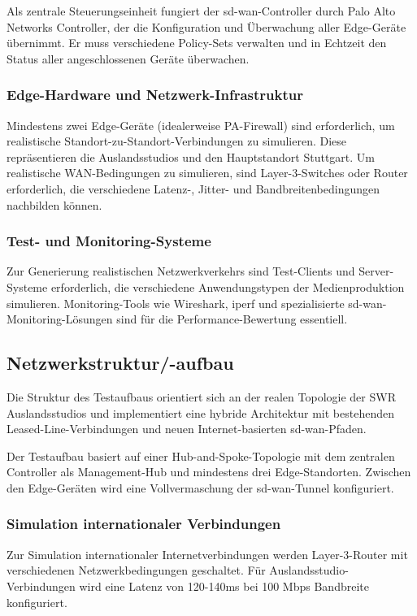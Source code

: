 Als zentrale Steuerungseinheit fungiert der \ac{sd-wan}-Controller durch Palo Alto Networks Controller, der die Konfiguration und Überwachung aller Edge-Geräte übernimmt. Er muss verschiedene Policy-Sets verwalten und in Echtzeit den Status aller angeschlossenen Geräte überwachen.

\subsubsection*{Edge-Hardware und Netzwerk-Infrastruktur}

Mindestens zwei Edge-Geräte (idealerweise PA-Firewall) sind erforderlich, um realistische Standort-zu-Standort-Verbindungen zu simulieren. Diese repräsentieren die Auslandsstudios und den Hauptstandort Stuttgart. Um realistische WAN-Bedingungen zu simulieren, sind Layer-3-Switches oder Router erforderlich, die verschiedene Latenz-, Jitter- und Bandbreitenbedingungen nachbilden können.

\subsubsection*{Test- und Monitoring-Systeme}

Zur Generierung realistischen Netzwerkverkehrs sind Test-Clients und Server-Sys\-teme erforderlich, die verschiedene Anwendungstypen der Medienproduktion simulieren. Monitoring-Tools wie Wireshark, iperf und spezialisierte \ac{sd-wan}-Monitoring-Lösungen sind für die Performance-Bewertung essentiell.

\subsection*{Netzwerkstruktur/-aufbau}
Die Struktur des Testaufbaus orientiert sich an der realen Topologie der SWR Auslandsstudios und implementiert eine hybride Architektur mit bestehenden Leased-Line-Verbindungen und neuen Internet-basierten \ac{sd-wan}-Pfaden.

Der Testaufbau basiert auf einer Hub-and-Spoke-Topologie mit dem zentralen Controller als Management-Hub und mindestens drei Edge-Standorten. Zwischen den Edge-Geräten wird eine Vollvermaschung der \ac{sd-wan}-Tunnel konfiguriert.

\subsubsection*{Simulation internationaler Verbindungen}

Zur Simulation internationaler Internetverbindungen werden Layer-3-Router mit verschiedenen Netzwerkbedingungen geschaltet. Für Auslandsstudio-Verbindungen wird eine Latenz von 120-140ms bei 100 Mbps Bandbreite konfiguriert.

